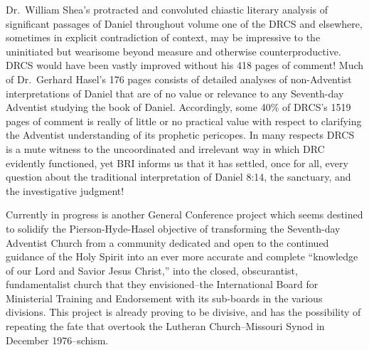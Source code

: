 Dr.\ William Shea's protracted and convoluted chiastic literary analysis of
significant passages of Daniel throughout volume one of the DRCS and
elsewhere, sometimes in explicit contradiction of context, may be impressive
to the uninitiated but wearisome beyond measure and otherwise
counterproductive. DRCS would have been vastly improved without his 418
pages of comment! Much of Dr.\ Gerhard Hasel's 176 pages consists of
detailed analyses of non-Adventist interpretations of Daniel that are of no
value or relevance to any Seventh-day Adventist studying the book of Daniel.
Accordingly, some 40\% of DRCS's 1519 pages of comment is really of little or
no practical value with respect to clarifying the Adventist understanding of
its prophetic pericopes. In many respects DRCS is a mute witness to the
uncoordinated and irrelevant way in which DRC evidently functioned, yet BRI
informs us that it has settled, once for all, every question about the
traditional interpretation of Daniel 8:14, the sanctuary, and the
investigative judgment!

Currently in progress is another General Conference project which seems
destined to solidify the Pierson-Hyde-Hasel objective of transforming the
Seventh-day Adventist Church from a community dedicated and open to the
continued guidance of the Holy Spirit into an ever more accurate and
complete ``knowledge of our Lord and Savior Jesus Christ,'' into the
closed, obscurantist, fundamentalist church that they envisioned--the
International Board for Ministerial Training and Endorsement with its
sub-boards in the various divisions. This project is already proving to be
divisive, and has the possibility of repeating the fate that overtook the
Lutheran Church--Missouri Synod in December 1976--schism.
